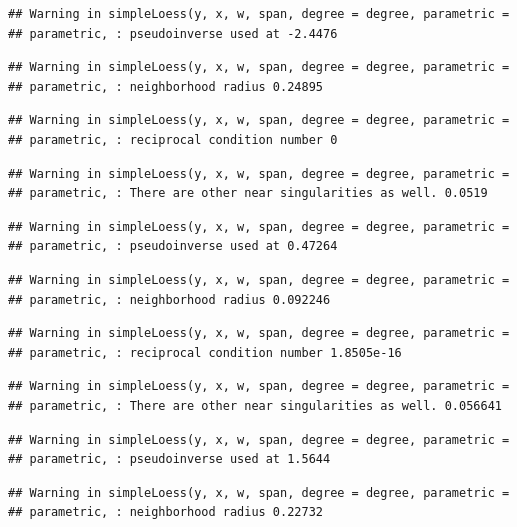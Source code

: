 \documentclass[]{article}
\begin{document}
\begin{verbatim}
## Warning in simpleLoess(y, x, w, span, degree = degree, parametric =
## parametric, : pseudoinverse used at -2.4476
\end{verbatim}

\begin{verbatim}
## Warning in simpleLoess(y, x, w, span, degree = degree, parametric =
## parametric, : neighborhood radius 0.24895
\end{verbatim}

\begin{verbatim}
## Warning in simpleLoess(y, x, w, span, degree = degree, parametric =
## parametric, : reciprocal condition number 0
\end{verbatim}

\begin{verbatim}
## Warning in simpleLoess(y, x, w, span, degree = degree, parametric =
## parametric, : There are other near singularities as well. 0.0519
\end{verbatim}

\begin{verbatim}
## Warning in simpleLoess(y, x, w, span, degree = degree, parametric =
## parametric, : pseudoinverse used at 0.47264
\end{verbatim}

\begin{verbatim}
## Warning in simpleLoess(y, x, w, span, degree = degree, parametric =
## parametric, : neighborhood radius 0.092246
\end{verbatim}

\begin{verbatim}
## Warning in simpleLoess(y, x, w, span, degree = degree, parametric =
## parametric, : reciprocal condition number 1.8505e-16
\end{verbatim}

\begin{verbatim}
## Warning in simpleLoess(y, x, w, span, degree = degree, parametric =
## parametric, : There are other near singularities as well. 0.056641
\end{verbatim}

\begin{verbatim}
## Warning in simpleLoess(y, x, w, span, degree = degree, parametric =
## parametric, : pseudoinverse used at 1.5644
\end{verbatim}

\begin{verbatim}
## Warning in simpleLoess(y, x, w, span, degree = degree, parametric =
## parametric, : neighborhood radius 0.22732
\end{verbatim}
\end{document}
